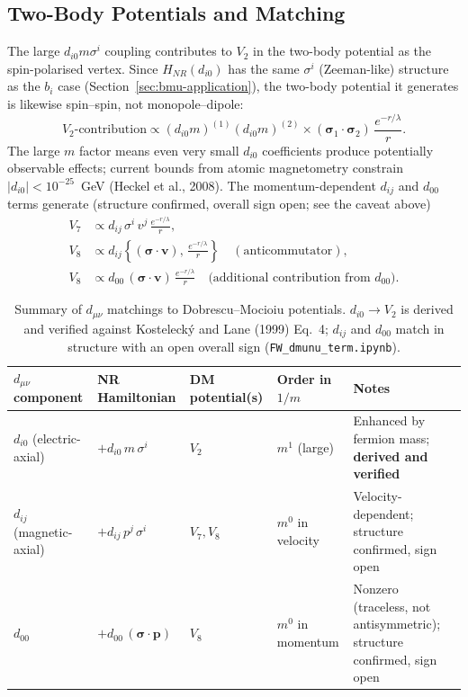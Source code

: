 \documentclass[main]{subfiles}
\begin{document}
\subsection{Two-Body Potentials and Matching}

The large $d_{i0}m\sigma^i$ coupling contributes to $V_2$ in the two-body
potential as the spin-polarised vertex. Since $H_{NR}(d_{i0})$ has the same
$\sigma^i$ (Zeeman-like) structure as the $b_i$ case
(Section~\ref{sec:bmu-application}), the two-body potential it generates is
likewise spin--spin, not monopole--dipole:
\begin{equation}
  V_2\text{-contribution} \propto (d_{i0}m)^{(1)}(d_{i0}m)^{(2)}\times
  (\boldsymbol\sigma_1\cdot\boldsymbol\sigma_2)\,\frac{e^{-r/\lambda}}{r}.
\end{equation}
The large $m$ factor means even very small $d_{i0}$ coefficients produce
potentially observable effects; current bounds from atomic magnetometry
constrain $|d_{i0}|<10^{-25}$~GeV (Heckel et al., 2008). The
momentum-dependent $d_{ij}$ and $d_{00}$ terms generate (structure
confirmed, overall sign open; see the caveat above)
\begin{align}
  V_7 &\propto d_{ij}\,\sigma^i\,v^j\,\frac{e^{-r/\lambda}}{r}, \\
  V_8 &\propto d_{ij}\left\{(\boldsymbol\sigma\cdot\mathbf v),\,\frac{e^{-r/\lambda}}{r}\right\}
  \quad (\text{anticommutator}), \\
  V_8 &\propto d_{00}\,(\boldsymbol\sigma\cdot\mathbf v)\,\frac{e^{-r/\lambda}}{r}
  \quad \text{(additional contribution from } d_{00}\text{)}.
\end{align}

\begin{table}[h]
\centering
\begin{tabular}{@{}l l l l >{\raggedright\arraybackslash}p{4cm}@{}}
\toprule
$d_{\mu\nu}$ component & NR Hamiltonian & DM potential(s) & Order in $1/m$ & Notes \\
\midrule
$d_{i0}$ (electric-axial) & $+d_{i0}\,m\,\sigma^i$ & $V_2$ & $m^1$ (large) & Enhanced by fermion mass; \textbf{derived and verified} \\
$d_{ij}$ (magnetic-axial) & $+d_{ij}\,p^j\,\sigma^i$ & $V_7, V_8$ & $m^0$ in velocity & Velocity-dependent; structure confirmed, sign open \\
$d_{00}$ & $+d_{00}\,(\boldsymbol\sigma\cdot\mathbf p)$ & $V_8$ & $m^0$ in momentum & Nonzero (traceless, not antisymmetric); structure confirmed, sign open \\
\bottomrule
\end{tabular}
\caption{Summary of $d_{\mu\nu}$ matchings to Dobrescu--Mocioiu potentials. $d_{i0}\to V_2$ is derived and verified against Kostelecký and Lane (1999) Eq.~4; $d_{ij}$ and $d_{00}$ match in structure with an open overall sign (\texttt{FW\_dmunu\_term.ipynb}).}
\end{table}
\end{document}
